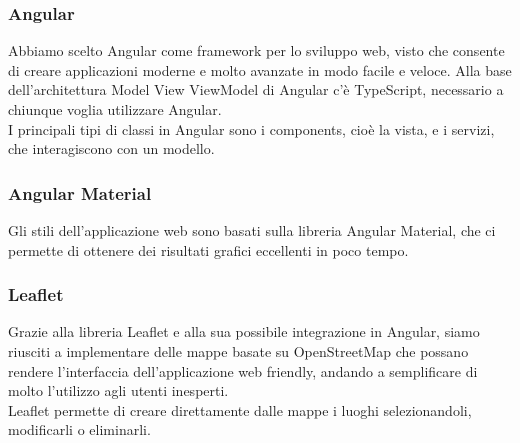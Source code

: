 \documentclass[../manuale-sviluppatore.tex]{subfiles}
\begin{document}
\subsubsection{Angular}%
\label{sub:angular}
Abbiamo scelto Angular come framework per lo sviluppo web, visto che consente di creare applicazioni moderne e molto avanzate in modo facile e veloce.
Alla base dell'architettura Model View ViewModel di Angular c'è TypeScript, necessario a chiunque voglia utilizzare Angular.\\
I principali tipi di classi in Angular sono i components, cioè la vista, e i servizi, che interagiscono con un modello.

\subsubsection{Angular Material}%
\label{sub:angular}
Gli stili dell'applicazione web sono basati sulla libreria Angular Material, che ci permette di ottenere dei risultati grafici eccellenti in poco tempo.


\subsubsection{Leaflet}%
\label{sub:angular}
Grazie alla libreria Leaflet e alla sua possibile integrazione in Angular, siamo riusciti a implementare delle mappe basate su OpenStreetMap che possano rendere
l'interfaccia dell'applicazione web friendly, andando a semplificare di molto l'utilizzo agli utenti inesperti.\\
 Leaflet permette di creare direttamente dalle mappe i luoghi selezionandoli, modificarli o eliminarli.
\end{document}
